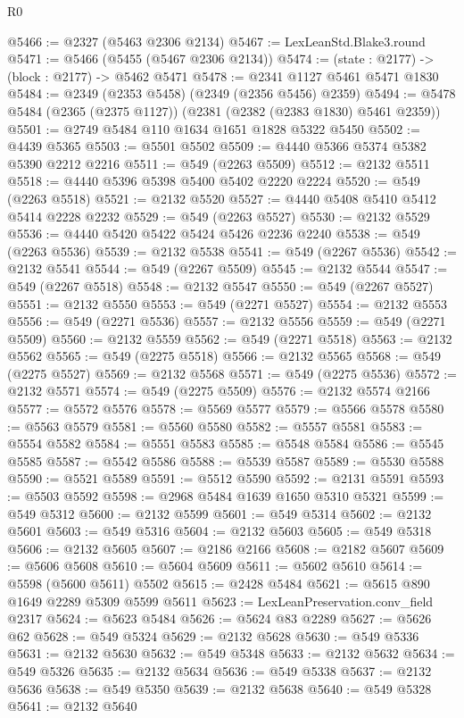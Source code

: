 \begin{lexlean}{R0}
\begin{coremodule}
@5466 := @2327 (@5463 @2306 @2134)
@5467 := LexLeanStd.Blake3.round
@5471 := @5466 (@5455 (@5467 @2306 @2134))
@5474 := (state : @2177) -> (block : @2177) -> @5462 @5471
@5478 := @2341 @1127 @5461 @5471 @1830
@5484 := @2349 (@2353 @5458) (@2349 (@2356 @5456) @2359)
@5494 := @5478 @5484 (@2365 (@2375 @1127)) (@2381 (@2382 (@2383 @1830) @5461 @2359))
@5501 := @2749 @5484 @110 @1634 @1651 @1828 @5322 @5450
@5502 := @4439 @5365
@5503 := @5501 @5502
@5509 := @4440 @5366 @5374 @5382 @5390 @2212 @2216
@5511 := @549 (@2263 @5509)
@5512 := @2132 @5511
@5518 := @4440 @5396 @5398 @5400 @5402 @2220 @2224
@5520 := @549 (@2263 @5518)
@5521 := @2132 @5520
@5527 := @4440 @5408 @5410 @5412 @5414 @2228 @2232
@5529 := @549 (@2263 @5527)
@5530 := @2132 @5529
@5536 := @4440 @5420 @5422 @5424 @5426 @2236 @2240
@5538 := @549 (@2263 @5536)
@5539 := @2132 @5538
@5541 := @549 (@2267 @5536)
@5542 := @2132 @5541
@5544 := @549 (@2267 @5509)
@5545 := @2132 @5544
@5547 := @549 (@2267 @5518)
@5548 := @2132 @5547
@5550 := @549 (@2267 @5527)
@5551 := @2132 @5550
@5553 := @549 (@2271 @5527)
@5554 := @2132 @5553
@5556 := @549 (@2271 @5536)
@5557 := @2132 @5556
@5559 := @549 (@2271 @5509)
@5560 := @2132 @5559
@5562 := @549 (@2271 @5518)
@5563 := @2132 @5562
@5565 := @549 (@2275 @5518)
@5566 := @2132 @5565
@5568 := @549 (@2275 @5527)
@5569 := @2132 @5568
@5571 := @549 (@2275 @5536)
@5572 := @2132 @5571
@5574 := @549 (@2275 @5509)
@5576 := @2132 @5574 @2166
@5577 := @5572 @5576
@5578 := @5569 @5577
@5579 := @5566 @5578
@5580 := @5563 @5579
@5581 := @5560 @5580
@5582 := @5557 @5581
@5583 := @5554 @5582
@5584 := @5551 @5583
@5585 := @5548 @5584
@5586 := @5545 @5585
@5587 := @5542 @5586
@5588 := @5539 @5587
@5589 := @5530 @5588
@5590 := @5521 @5589
@5591 := @5512 @5590
@5592 := @2131 @5591
@5593 := @5503 @5592
@5598 := @2968 @5484 @1639 @1650 @5310 @5321
@5599 := @549 @5312
@5600 := @2132 @5599
@5601 := @549 @5314
@5602 := @2132 @5601
@5603 := @549 @5316
@5604 := @2132 @5603
@5605 := @549 @5318
@5606 := @2132 @5605
@5607 := @2186 @2166
@5608 := @2182 @5607
@5609 := @5606 @5608
@5610 := @5604 @5609
@5611 := @5602 @5610
@5614 := @5598 (@5600 @5611) @5502
@5615 := @2428 @5484
@5621 := @5615 @890 @1649 @2289 @5309 @5599 @5611
@5623 := LexLeanPreservation.conv_field @2317
@5624 := @5623 @5484
@5626 := @5624 @83 @2289
@5627 := @5626 @62
@5628 := @549 @5324
@5629 := @2132 @5628
@5630 := @549 @5336
@5631 := @2132 @5630
@5632 := @549 @5348
@5633 := @2132 @5632
@5634 := @549 @5326
@5635 := @2132 @5634
@5636 := @549 @5338
@5637 := @2132 @5636
@5638 := @549 @5350
@5639 := @2132 @5638
@5640 := @549 @5328
@5641 := @2132 @5640

\end{coremodule}
\end{lexlean}
